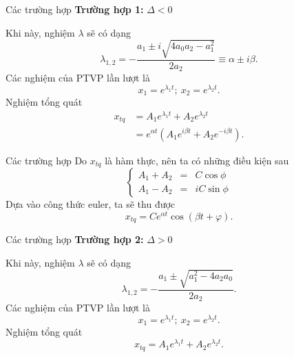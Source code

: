 \begin{frame}{Các trường hợp}
    \textbf{Trường hợp 1:} \(\Delta < 0\)
    \vspace{2mm}

    Khi này, nghiệm \(\lambda\) sẽ có dạng
    \begin{equation*}
    \displaystyle 
        \lambda_{1,2} = -\frac{a_1 \pm i \sqrt{4 a_0 a_2 - a_1^2}}{2a_2} \equiv \alpha \pm i \beta.
    \end{equation*}
    Các nghiệm của PTVP lần lượt là
    \begin{equation*}
        x_1 =  e^{\lambda_1 t}; \ x_2 =  e^{\lambda_2 t}.
    \end{equation*}
    Nghiệm tổng quát
    \begin{equation*}
    \begin{split}
        x_{tq} &= A_1 e^{\lambda_1 t} + A_2 e^{\lambda_2 t} \\
        &= e^{\alpha t} \left( A_1 e^{i\beta t} + A_2 e^{-i\beta t} \right).
    \end{split}
    \end{equation*}
\end{frame}
\begin{frame}{Các trường hợp}
    Do \(x_{tq}\) là hàm thực, nên ta có những điều kiện sau
    \begin{equation*}
    \left\{
    \begin{array}{ccc}
    A_1 + A_2 &=& C \cos \phi \\
    A_1 - A_2 &=& i C \sin \phi
    \end{array}
    \right.
    \end{equation*}
    Dựa vào công thức euler, ta sẽ thu được
    \begin{equation*}
        x_{tq} = C e^{\alpha t} \cos{(\beta t + \varphi)}.
    \end{equation*}
\end{frame}
\begin{frame}{Các trường hợp}
    \textbf{Trường hợp 2:} \(\Delta > 0\)
    \vspace{2mm}

    Khi này, nghiệm \(\lambda\) sẽ có dạng
    \begin{equation*}
        \lambda_{1,2} = -\frac{a_1 \pm  \sqrt{a_1^2-4 a_2 a_0}}{2a_2}.
    \end{equation*}
    Các nghiệm của PTVP lần lượt là
    \begin{equation*}
        x_1 = e^{\lambda_1 t} ; \ x_2 = e^{\lambda_2 t}.
    \end{equation*}
    Nghiệm tổng quát
    \begin{equation*}
        x_{tq} = A_1 e^{\lambda_1 t} + A_2e^{\lambda_2 t}.
    \end{equation*}
\end{frame}
